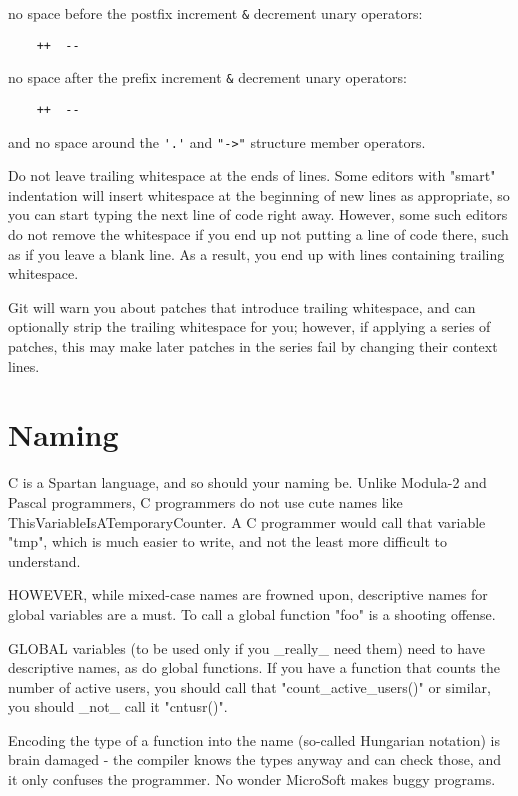 \documentclass[pdftex,12pt, twocol]{article} %
\begin{document}
no space before the postfix increment \verb+&+ decrement unary operators:

\begin{verbatim}
	++  --
\end{verbatim}

no space after the prefix increment \verb+&+ decrement unary operators:

\begin{verbatim}
	++  --
\end{verbatim}

and no space around the \verb+'.'+ and \verb+"->"+ structure member operators.

Do not leave trailing whitespace at the ends of lines.  Some editors with
"smart" indentation will insert whitespace at the beginning of new lines as
appropriate, so you can start typing the next line of code right away.
However, some such editors do not remove the whitespace if you end up not
putting a line of code there, such as if you leave a blank line.  As a result,
you end up with lines containing trailing whitespace.

Git will warn you about patches that introduce trailing whitespace, and can
optionally strip the trailing whitespace for you; however, if applying a series
of patches, this may make later patches in the series fail by changing their
context lines.


\section{Naming}

C is a Spartan language, and so should your naming be.  Unlike Modula-2
and Pascal programmers, C programmers do not use cute names like
ThisVariableIsATemporaryCounter.  A C programmer would call that
variable "tmp", which is much easier to write, and not the least more
difficult to understand.

HOWEVER, while mixed-case names are frowned upon, descriptive names for
global variables are a must.  To call a global function "foo" is a
shooting offense.

GLOBAL variables (to be used only if you \_really\_ need them) need to
have descriptive names, as do global functions.  If you have a function
that counts the number of active users, you should call that
"count\_active\_users()" or similar, you should \_not\_ call it "cntusr()".

Encoding the type of a function into the name (so-called Hungarian
notation) is brain damaged - the compiler knows the types anyway and can
check those, and it only confuses the programmer.  No wonder MicroSoft
makes buggy programs.
\end{document}

